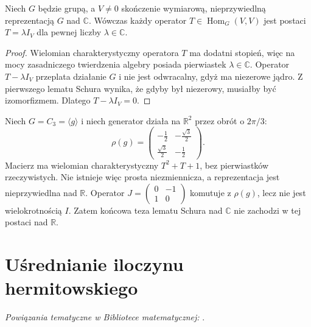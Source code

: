 \begin{twierdzenie}
\label{aa:tw:schur-complex}
Niech \(G\) będzie grupą, a \(V\ne0\) skończenie
wymiarową, nieprzywiedlną reprezentacją \(G\)
nad \(\mathbb C\). Wówczas każdy operator
\(T\in\operatorname{Hom}_G(V,V)\) jest postaci
\(T=\lambda I_V\) dla pewnej liczby
\(\lambda\in\mathbb C\).
\end{twierdzenie}
\begin{proof}
Wielomian charakterystyczny operatora \(T\)
ma dodatni stopień, więc na mocy zasadniczego
twierdzenia algebry posiada pierwiastek
\(\lambda\in\mathbb C\).
Operator \(T-\lambda I_V\) przeplata działanie \(G\)
i nie jest odwracalny, gdyż ma niezerowe jądro.
Z pierwszego lematu Schura wynika, że gdyby był
niezerowy, musiałby być izomorfizmem.
Dlatego \(T-\lambda I_V=0\).
\end{proof}

\begin{przyklad}
\label{aa:prz:schur-real}
Niech \(G=C_3=\langle g\rangle\) i niech generator działa
na \(\mathbb R^2\) przez obrót o \(2\pi/3\):
\[
\rho(g)=
\begin{pmatrix}
-\frac12&-\frac{\sqrt3}{2}\\
\frac{\sqrt3}{2}&-\frac12
\end{pmatrix}.
\]
Macierz ma wielomian charakterystyczny \(T^2+T+1\),
bez pierwiastków rzeczywistych. Nie istnieje więc
prosta niezmiennicza, a reprezentacja jest nieprzywiedlna
nad \(\mathbb R\). Operator
\(J=\left(\begin{smallmatrix}0&-1\\1&0\end{smallmatrix}\right)\)
komutuje z \(\rho(g)\), lecz nie jest wielokrotnością
\(I\). Zatem końcowa teza lematu Schura nad \(\mathbb C\)
nie zachodzi w tej postaci nad \(\mathbb R\).
\end{przyklad}

\section{Uśrednianie iloczynu hermitowskiego}

\noindent\emph{Powiązania tematyczne w Bibliotece matematycznej:} .


